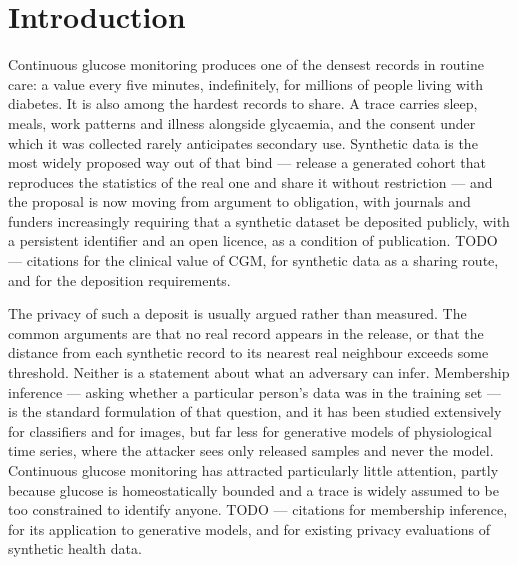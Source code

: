 \documentclass[pdflatex,sn-nature]{sn-jnl}
\theoremstyle{thmstyleone}
\begin{document}
\maketitle

\section{Introduction}\label{sec:intro}

Continuous glucose monitoring produces one of the densest records in routine
care: a value every five minutes, indefinitely, for millions of people living
with diabetes. It is also among the hardest records to share. A trace carries
sleep, meals, work patterns and illness alongside glycaemia, and the consent
under which it was collected rarely anticipates secondary use. Synthetic data is
the most widely proposed way out of that bind --- release a generated cohort that
reproduces the statistics of the real one and share it without restriction ---
and the proposal is now moving from argument to obligation, with journals and
funders increasingly requiring that a synthetic dataset be deposited publicly,
with a persistent identifier and an open licence, as a condition of publication.
TODO --- citations for the clinical value of CGM, for synthetic data as a
sharing route, and for the deposition requirements.

The privacy of such a deposit is usually argued rather than measured. The common
arguments are that no real record appears in the release, or that the distance
from each synthetic record to its nearest real neighbour exceeds some threshold.
Neither is a statement about what an adversary can infer. Membership inference
--- asking whether a particular person's data was in the training set --- is the
standard formulation of that question, and it has been studied extensively for
classifiers and for images, but far less for generative models of physiological
time series, where the attacker sees only released samples and never the model.
Continuous glucose monitoring has attracted particularly little attention,
partly because glucose is homeostatically bounded and a trace is widely assumed
to be too constrained to identify anyone. TODO --- citations for membership
inference, for its application to generative models, and for existing privacy
evaluations of synthetic health data.
\end{document}
